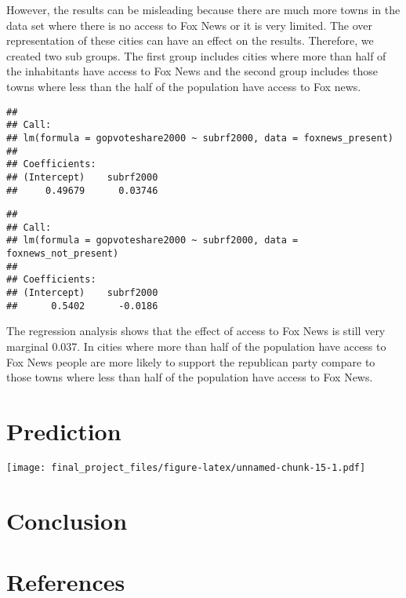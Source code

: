 \documentclass[
]{article}
\begin{document}
However, the results can be misleading because there are much more towns in the data set where there is no access to Fox News or it is very limited. The over representation of these cities can have an effect on the results. Therefore, we created two sub groups. The first group includes cities where more than half of the inhabitants have access to Fox News and the second group includes those towns where less than the half of the population have access to Fox news.

\begin{verbatim}
## 
## Call:
## lm(formula = gopvoteshare2000 ~ subrf2000, data = foxnews_present)
## 
## Coefficients:
## (Intercept)    subrf2000  
##     0.49679      0.03746
\end{verbatim}

\begin{verbatim}
## 
## Call:
## lm(formula = gopvoteshare2000 ~ subrf2000, data = foxnews_not_present)
## 
## Coefficients:
## (Intercept)    subrf2000  
##      0.5402      -0.0186
\end{verbatim}

The regression analysis shows that the effect of access to Fox News is still very marginal 0.037. In cities where more than half of the population have access to Fox News people are more likely to support the republican party compare to those towns where less than half of the population have access to Fox News.

\hypertarget{prediction}{%
\section{Prediction}\label{prediction}}

\texttt{[image: final\_project\_files/figure-latex/unnamed-chunk-15-1.pdf]}

\hypertarget{conclusion}{%
\section{Conclusion}\label{conclusion}}

\newpage

\hypertarget{references}{%
\section*{References}\label{references}}
\end{document}
